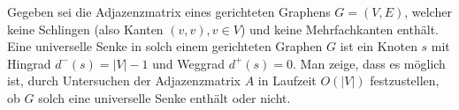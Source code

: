 
\begin{exercise}

Gegeben sei die Adjazenzmatrix eines gerichteten Graphens $G = (V,E)$, welcher
keine Schlingen (also Kanten $(v,v), v \in V$) und keine Mehrfachkanten enthält.
Eine universelle Senke in solch einem gerichteten Graphen $G$ ist ein Knoten $s$
mit Hingrad $d^-(s) = |V| - 1$ und Weggrad $d^+(s) = 0$. Man zeige, dass es möglich
ist, durch Untersuchen der Adjazenzmatrix $A$ in Laufzeit $O(|V|)$ festzustellen,
ob $G$ solch eine universelle Senke enthält oder nicht. \\

\end{exercise}


